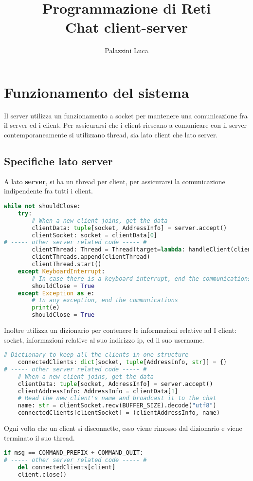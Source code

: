 \documentclass[12pt]{article}
\title{Programmazione di Reti \\ Chat client-server}
\author{Palazzini Luca}
\begin{document}
\maketitle
\section{Funzionamento del sistema}
Il server utilizza un funzionamento a socket per mantenere una comunicazione fra il server ed i client.
%
Per assicurarsi che i client riescano a comunicare con il server contemporaneamente si utilizzano thread, sia lato client che lato server. 
\subsection{Specifiche lato server}
A lato \textbf{server}, si ha un thread per client, per assicurarsi la comunicazione indipendente fra tutti i client.
\begin{lstlisting}[language=Python, caption=Dizionario server]
while not shouldClose:
    try:
        # When a new client joins, get the data
        clientData: tuple[socket, AddressInfo] = server.accept()
        clientSocket: socket = clientData[0]
# ----- other server related code ----- #
        clientThread: Thread = Thread(target=lambda: handleClient(clientSocket))
        clientThreads.append(clientThread)
        clientThread.start()
    except KeyboardInterrupt:
        # In case there is a keyboard interrupt, end the communications
        shouldClose = True
    except Exception as e:
        # In any exception, end the communications
        print(e)
        shouldClose = True
\end{lstlisting}
Inoltre utilizza un dizionario per contenere le informazioni relative ad I client: socket, informazioni relative al suo indirizzo ip, ed il suo username.
\begin{lstlisting}[language=Python, caption=Dizionario server]
# Dictionary to keep all the clients in one structure
    connectedClients: dict[socket, tuple[AddressInfo, str]] = {}
# ----- other server related code ----- #
    # When a new client joins, get the data
    clientData: tuple[socket, AddressInfo] = server.accept()
    clientAddressInfo: AddressInfo = clientData[1]
    # Read the new client's name and broadcast it to the chat
    name: str = clientSocket.recv(BUFFER_SIZE).decode("utf8")
    connectedClients[clientSocket] = (clientAddressInfo, name)
\end{lstlisting}
Ogni volta che un client si disconnette, esso viene rimosso dal dizionario e viene terminato il suo thread.
\begin{lstlisting}[language=Python, caption=Logout del client]
if msg == COMMAND_PREFIX + COMMAND_QUIT:
# ----- other server related code ----- #
    del connectedClients[client]
    client.close()
\end{lstlisting}
\end{document}
